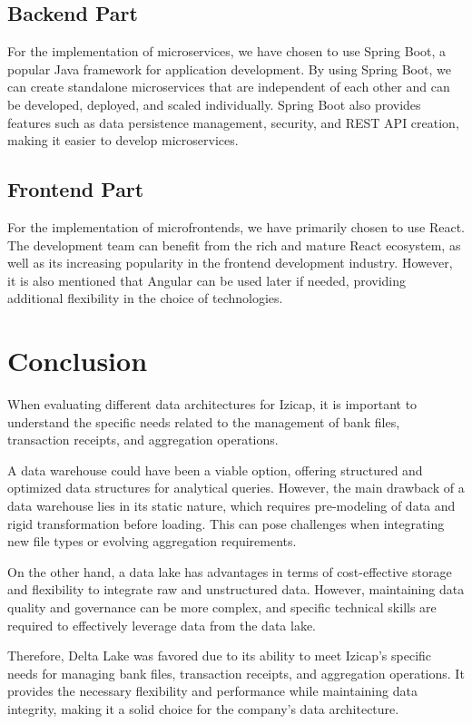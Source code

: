 \subsection{Backend Part}
For the implementation of microservices, we have chosen to use Spring Boot, a popular Java framework for application development. By using Spring Boot, we can create standalone microservices that are independent of each other and can be developed, deployed, and scaled individually. Spring Boot also provides features such as data persistence management, security, and REST API creation, making it easier to develop microservices.

\subsection{Frontend Part}
For the implementation of microfrontends, we have primarily chosen to use React. The development team can benefit from the rich and mature React ecosystem, as well as its increasing popularity in the frontend development industry. However, it is also mentioned that Angular can be used later if needed, providing additional flexibility in the choice of technologies.

\section*{Conclusion}
When evaluating different data architectures for Izicap, it is important to understand the specific needs related to the management of bank files, transaction receipts, and aggregation operations.

A data warehouse could have been a viable option, offering structured and optimized data structures for analytical queries. However, the main drawback of a data warehouse lies in its static nature, which requires pre-modeling of data and rigid transformation before loading. This can pose challenges when integrating new file types or evolving aggregation requirements.

On the other hand, a data lake has advantages in terms of cost-effective storage and flexibility to integrate raw and unstructured data. However, maintaining data quality and governance can be more complex, and specific technical skills are required to effectively leverage data from the data lake.

Therefore, Delta Lake was favored due to its ability to meet Izicap's specific needs for managing bank files, transaction receipts, and aggregation operations. It provides the necessary flexibility and performance while maintaining data integrity, making it a solid choice for the company's data architecture.

